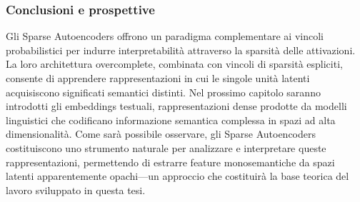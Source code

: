\subsubsection{Conclusioni e prospettive}

Gli Sparse Autoencoders offrono un paradigma complementare ai vincoli probabilistici per indurre interpretabilità attraverso la sparsità delle attivazioni. La loro architettura overcomplete, combinata con vincoli di sparsità espliciti, consente di apprendere rappresentazioni in cui le singole unità latenti acquisiscono significati semantici distinti.
Nel prossimo capitolo saranno introdotti gli embeddings testuali, rappresentazioni dense prodotte da modelli linguistici che codificano informazione semantica complessa in spazi ad alta dimensionalità. 
Come sarà possibile osservare, gli Sparse Autoencoders costituiscono uno strumento naturale per analizzare e interpretare queste rappresentazioni, permettendo di estrarre feature monosemantiche da spazi latenti apparentemente opachi—un approccio che costituirà la base teorica del lavoro sviluppato in questa tesi.